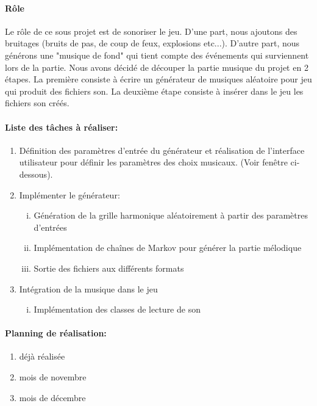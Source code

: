 \documentclass[a4paper,10pt]{article}
\begin{document}
\paragraph{Rôle}
Le rôle de ce sous projet est de sonoriser le jeu. D'une part, nous ajoutons des bruitages (bruits de pas, de coup de feux, explosions etc...). D'autre part, nous générons une "musique de fond" qui tient compte des événements qui surviennent lors de la partie.
Nous avons décidé de découper la partie musique du projet en 2 étapes. La première consiste à  écrire un générateur de musiques aléatoire pour  jeu qui produit des fichiers son.  La deuxième étape consiste à insérer dans le jeu les fichiers  son créés.


\paragraph{Liste des tâches à réaliser:}
\begin{enumerate}
 \item Définition des paramètres d’entrée du générateur et réalisation de l’interface utilisateur pour définir les paramètres des choix musicaux. (Voir fenêtre ci-dessous).
 \item Implémenter le générateur:
 \begin{enumerate}[(i)]
  \item Génération de la grille harmonique aléatoirement à partir des paramètres d’entrées
  \item Implémentation de chaînes de Markov pour générer la partie mélodique
  \item Sortie des fichiers aux différents formats
 \end{enumerate}
 \item Intégration de la musique dans le jeu
 \begin{enumerate}[(i)]
 \item Implémentation des classes de lecture de son 
 \end{enumerate}
 

\end{enumerate}
\paragraph{Planning de réalisation:}
\begin{enumerate}[1-]
 \item déjà réalisée
 \item mois de novembre
 \item mois de décembre
\end{enumerate}
\end{document}
